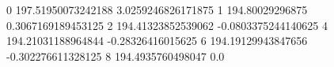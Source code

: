 0 197.51950073242188 3.0259246826171875
1 194.80029296875 0.3067169189453125
2 194.41323852539062 -0.0803375244140625
4 194.21031188964844 -0.28326416015625
6 194.19129943847656 -0.302276611328125
8 194.4935760498047 0.0
